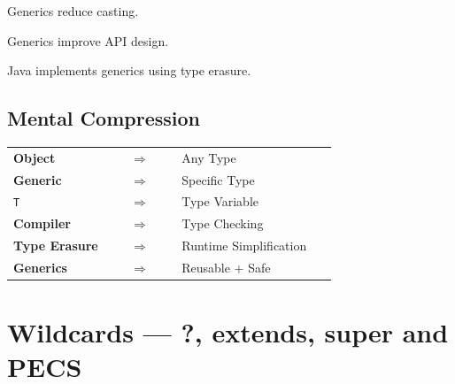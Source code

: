 \documentclass[11pt,a4paper]{book}
\begin{document}
\begin{rosettarule}

Generics reduce casting.

\end{rosettarule}

\begin{rosettarule}

Generics improve API design.

\end{rosettarule}

\begin{rosettarule}

Java implements generics using type erasure.

\end{rosettarule}

\section{Mental Compression}

\begin{center}

\renewcommand{\arraystretch}{1.55}

\begin{tabular}{p{0.30\linewidth}
                c
                p{0.48\linewidth}}

\textbf{Object}
&
$\Rightarrow$
&
Any Type
\\

\textbf{Generic}
&
$\Rightarrow$
&
Specific Type
\\

\texttt{T}
&
$\Rightarrow$
&
Type Variable
\\

\textbf{Compiler}
&
$\Rightarrow$
&
Type Checking
\\

\textbf{Type Erasure}
&
$\Rightarrow$
&
Runtime Simplification
\\

\textbf{Generics}
&
$\Rightarrow$
&
Reusable + Safe

\end{tabular}

\end{center}
\chapter{Wildcards --- ?, extends, super and PECS}
\end{document}

